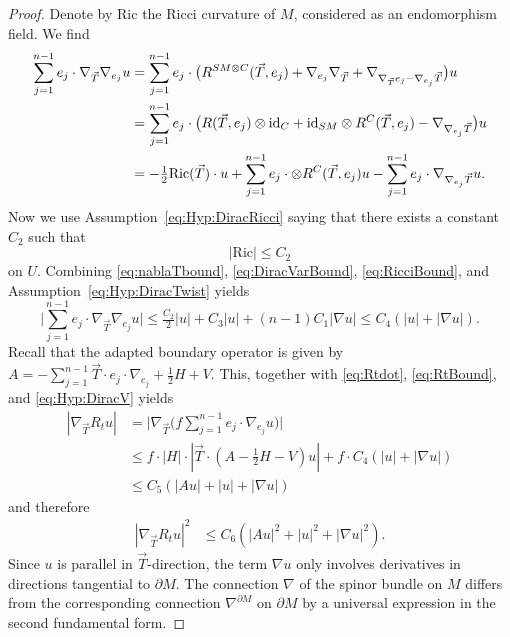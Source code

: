 \documentclass[a4paper,10pt,reqno]{amsart}
\newcommand{\id}{\mathrm{id}}
\newcommand{\Ric}{\mathrm{Ric}}
\newcommand{\dM}{\partial M}
\theoremstyle{definition}
\begin{document}
\begin{proof}
Denote by $\Ric$ the Ricci curvature of $M$, considered as an endomorphism field.
We find
\begin{align}
\sum_{j=1}^{n-1} e_j\cdot \nabla_{\vec{T}}\nabla_{e_j}u
 & =
\sum_{j=1}^{n-1} e_j\cdot \big(R^{SM\otimes C}(\vec{T},e_j)+ \nabla_{e_j}\nabla_{\vec{T}}+\nabla_{\nabla_{\vec{T}}e_j-\nabla_{e_j}\vec{T}}\big)u \notag \\
 & =
\sum_{j=1}^{n-1} e_j\cdot \big(R(\vec{T},e_j)\otimes \id_C + \id_{SM}\otimes R^C(\vec{T},e_j) - \nabla_{\nabla_{e_j}\vec{T}}\big)u \notag               \\
 & =
-\tfrac12 \Ric(\vec{T})\cdot u + \sum_{j=1}^{n-1} e_j\cdot\otimes R^C(\vec{T},e_j)u - \sum_{j=1}^{n-1}e_j \cdot\nabla_{\nabla_{e_j}\vec{T}}u .
\label{eq:DiracVarBound}
\end{align}
Now we use Assumption~\ref{eq:Hyp:DiracRicci} saying that there exists a constant $C_2$ such that
\begin{equation}
|\Ric| \le C_2
\label{eq:RicciBound}
\end{equation}
on $U$.
Combining \eqref{eq:nablaTbound}, \eqref{eq:DiracVarBound}, \eqref{eq:RicciBound}, and Assumption~\ref{eq:Hyp:DiracTwist} yields
\begin{equation}
\bigg|\sum_{j=1}^{n-1} e_j\cdot \nabla_{\vec{T}}\nabla_{e_j}u\bigg|
\le
\tfrac{C_2}{2}|u| + C_3|u|  + (n-1)C_1|\nabla u|
\le C_4(|u|+|\nabla u|) .
\label{eq:RtBound}
\end{equation}
Recall that the adapted boundary operator is given by $A=-\sum_{j=1}^{n-1} \vec{T}\cdot e_j\cdot \nabla_{e_j}+\frac12 H + V$.
This, together with \eqref{eq:Rtdot}, \eqref{eq:RtBound}, and \ref{eq:Hyp:DiracV} yields
\begin{align*}
|\nabla_{\vec{T}}R_t u|
 & =
\bigg|\nabla_{\vec{T}}\bigg(f\sum_{j=1}^{n-1} e_j\cdot \nabla_{e_j}u\bigg)\bigg|                                       \\
 & \le
f \cdot|H| \cdot|\vec{T}\cdot (A-\tfrac12 H-V)u| + f\cdot C_4(|u|+|\nabla u|) \\
 & \le
C_5(|Au|+|u|+|\nabla u|)
\end{align*}
and therefore
\begin{align*}
|\nabla_{\vec{T}}R_t u|^2
 & \le
C_6(|Au|^2+|u|^2+|\nabla u|^2) .
\end{align*}
Since $u$ is parallel in $\vec{T}$-direction, the term $\nabla u$ only involves derivatives in directions tangential to $\dM$.
The connection $\nabla$ of the spinor bundle on $M$ differs from the corresponding connection $\nabla^{\dM}$ on $\dM$ by a universal expression in the second fundamental form.

\end{proof}
\end{document}

